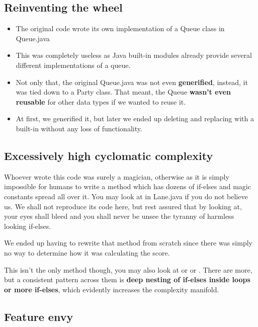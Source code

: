 \subsection{Reinventing the wheel}

\begin{itemize}
	\item The original code wrote its own implementation of a Queue class in Queue.java
	\item This was completely useless as Java built-in modules already provide several different implementations of a queue.
	\item Not only that, the original Queue.java was not even \textbf{generified}, instead, it was tied down to a Party class. That meant, the Queue \textbf{wasn't even reusable} for other data types if we wanted to reuse it.
	\item At first, we generified it, but later we ended up deleting and replacing with a built-in  without any loss of functionality.
\end{itemize}

\subsection{Excessively high cyclomatic complexity}

Whoever wrote this code was surely a magician, otherwise as it is simply impossible for humans to write a method which has dozens of if-elses and magic constants spread all over it. You may look at  in Lane.java if you do not believe us. We shall not reproduce its code here, but rest assured that by looking at, your eyes shall bleed and you shall never be unsee the tyranny of harmless looking if-elses.

We ended up having to rewrite that method from scratch since there was simply no way to determine how it was calculating the score.

This isn't the only method though, you may also look at  or  or . There are more, but a consistent pattern across them is \textbf{deep nesting of if-elses inside loops or more if-elses}, which evidently increases the complexity manifold.

\subsection{Feature envy}

